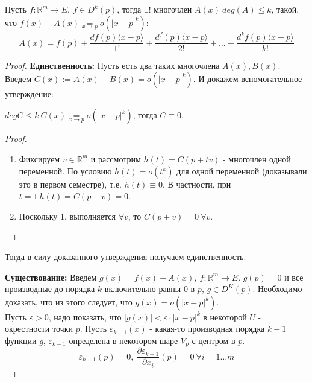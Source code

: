 \begin{theorem*}
    Пусть $f: \mathbb{R}^m \to E, \ f \in D^k(p)$, тогда $\exists!$ многочлен $A(x) \ deg(A) \leq k$,
    такой, что $f(x) - A(x) \underset{x \to p}{=} o(\left| x - p\right|^k)$:
    \[A(x) = f(p) + \frac{df(p) \langle x-p \rangle}{1!} + \frac{d^f(p)\langle x-p \rangle}{2!} + \hdots + \frac{d^kf(p)\langle x-p \rangle}{k!}\]
    \begin{proof}
        \textbf{Единственность:} Пусть есть два таких многочлена $A(x), B(x)$. Введем $C(x) := A(x) - B(x) = o(\left| x - p\right|^k)$. И докажем вспомогательное утверждение:
        \begin{statement*}
            $degC \leq k \ C(x) \underset{x \to p}{=} o(\left|x-p\right|^k)$, тогда $C \equiv 0$.
            \begin{proof}
                \begin{enumerate}
                    \item Фиксируем $v \in \mathbb{R}^m$ и рассмотрим $h(t) = C(p+tv)$ - многочлен одной переменной.
                    По условию $h(t) = o(t^k)$ для одной переменной (доказывали это в первом семестре), т.е. $h(t) \equiv 0$. В частности, при $t = 1 \ h(t) = C(p+v) = 0$.
                    \item Поскольку 1. выполняется $\forall v$, то $C(p+v) = 0 \  \forall v$.
                \end{enumerate}
            \end{proof}
            Тогда в силу доказанного утверждения получаем единственность.
        \end{statement*}
        \par
        \textbf{Существование:}
        Введем $g(x) = f(x) - A(x), \ f:\mathbb{R}^m \to E$. $g(p) = 0$ и все производные до порядка $k$
        включительно равны $0$ в $p$, $g \in D^K(p)$. Необходимо доказать, что из этого следует, что $g(x) = o(\left| x - p\right|^k)$.
        \\
        Пусть $\varepsilon > 0$, надо показать, что $\left| g(x) \right| < \varepsilon\cdot \left| x - p\right|^k$ в некоторой $U$ - окрестности точки $p$.
        Пусть $\varepsilon_{k-1}(x)$ - какая-то производная порядка $k-1$ функции $g$, $\varepsilon_{k-1}$ определена в некотором шаре $V_p$ с центром в $p$.
        \begin{equation}
            \label{eq1}
            \varepsilon_{k-1}(p) = 0, \ \frac{\partial \varepsilon_{k-1}}{\partial x_i}(p) = 0 \ \forall i = 1 \hdots m

\end{equation}
\end{proof}
\end{theorem*}
